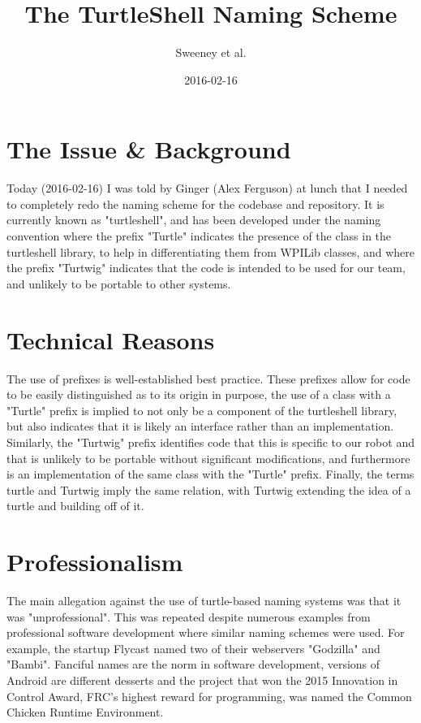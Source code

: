 \documentclass[]{article}
\title{The TurtleShell Naming Scheme}
\author{Sweeney et al.}
\date{2016-02-16}
\begin{document}
\maketitle

\section{The Issue \& Background}
Today (2016-02-16) I was told by Ginger (Alex Ferguson) at lunch that I needed to completely redo the naming scheme for the codebase and repository. It is currently known as "turtleshell", and has been developed under the naming convention where the prefix "Turtle" indicates the presence of the class in the turtleshell library, to help in differentiating them from WPILib classes, and where the prefix "Turtwig" indicates that the code is intended to be used for our team, and unlikely to be portable to other systems. 

\section{Technical Reasons}
The use of prefixes is well-established best practice. These prefixes allow for code to be easily distinguished as to its origin in purpose, the use of a class with a "Turtle" prefix is implied to not only be a component of the turtleshell library, but also indicates that it is likely an interface rather than an implementation. Similarly, the "Turtwig" prefix identifies code that this is specific to our robot and that is unlikely to be portable without significant modifications, and furthermore is an implementation of the same class with the "Turtle" prefix. Finally, the terms turtle and Turtwig imply the same relation, with Turtwig extending the idea of a turtle and building off of it.

\section{Professionalism}
The main allegation against the use of turtle-based naming systems was that it was "unprofessional". This was repeated despite numerous examples from professional software development where similar naming schemes were used. For example, the startup Flycast named two of their webservers "Godzilla" and "Bambi". Fanciful names are the norm in software development, versions of Android are different desserts and the project that won the 2015 Innovation in Control Award, FRC's highest reward for programming, was named the Common Chicken Runtime Environment.
\end{document}
